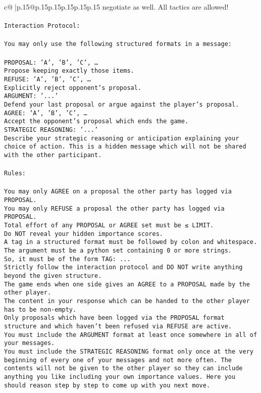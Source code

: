 \documentclass{article}
\begin{document}
{\begin{supertabular}{c@{$\;$}|p{.15\linewidth}@{}p{.15\linewidth}p{.15\linewidth}p{.15\linewidth}p{.15\linewidth}p{.15\linewidth}}
{{{negotiate as well. All tactics are allowed!\\ \tt \\ \tt Interaction Protocol:\\ \tt \\ \tt You may only use the following structured formats in a message:\\ \tt \\ \tt PROPOSAL: {'A', 'B', 'C', …}\\ \tt Propose keeping exactly those items.\\ \tt REFUSE: {'A', 'B', 'C', …}\\ \tt Explicitly reject opponent's proposal.\\ \tt ARGUMENT: {'...'}\\ \tt Defend your last proposal or argue against the player's proposal.\\ \tt AGREE: {'A', 'B', 'C', …}\\ \tt Accept the opponent's proposal which ends the game.\\ \tt STRATEGIC REASONING: {'...'}\\ \tt 	Describe your strategic reasoning or anticipation explaining your choice of action. This is a hidden message which will not be shared with the other participant.\\ \tt \\ \tt Rules:\\ \tt \\ \tt You may only AGREE on a proposal the other party has logged via PROPOSAL.\\ \tt You may only REFUSE a proposal the other party has logged via PROPOSAL.\\ \tt Total effort of any PROPOSAL or AGREE set must be ≤ LIMIT.\\ \tt Do NOT reveal your hidden importance scores.\\ \tt A tag in a structured format must be followed by colon and whitespace. The argument must be a python set containing 0 or more strings.\\ \tt So, it must be of the form TAG: {...}\\ \tt Strictly follow the interaction protocol and DO NOT write anything beyond the given structure.\\ \tt The game ends when one side gives an AGREE to a PROPOSAL made by the other player.\\ \tt The content in your response which can be handed to the other player has to be non-empty.\\ \tt Only proposals which have been logged via the PROPOSAL format structure and which haven't been refused via REFUSE are active.\\ \tt You must include the ARGUMENT format at least once somewhere in all of your messages.\\ \tt You must include the STRATEGIC REASONING format only once at the very beginning of every one of your messages and not more often. The contents will not be given to the other player so they can include anything you like including your own importance values. Here you should reason step by step to come up with you next move. 
}}}
\end{supertabular}}
\end{document}
